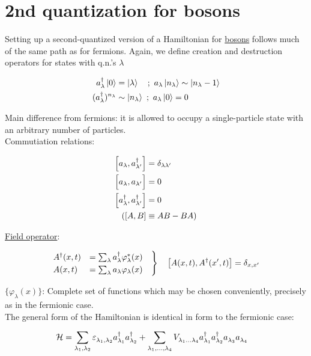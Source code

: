 \chapter{2nd quantization for bosons}

Setting up a second-quantized version of a Hamiltonian for \underline{bosons} follows much of the same path as for fermions. Again, we define creation and destruction operators for states with q.n.'s $\lambda$

\begin{align}
    a_\lambda^\dagger \ket{0} &= \ket{\lambda} \quad ; \ a_\lambda\ket{n_\lambda} \sim \ket{n_\lambda - 1} \\
    (a_\lambda^\dagger)^{n_\lambda} &\sim \ket{n_\lambda} \ ; \ a_\lambda\ket{0} = 0
\end{align}

Main difference from fermions: it is allowed to occupy a single-particle state with an arbitrary number of particles. \\  Commutiation relations:

\begin{align}
    \comm{a_\lambda}{a_{\lambda'}^\dagger} &= \delta_{\lambda \lambda'} \\
    \comm\Big{a_\lambda}{a_{\lambda'}} &= 0 \\
    \comm{a_\lambda^\dagger}{a_{\lambda'}^\dagger} &= 0 \\ 
    (\comm{A}{B} &\equiv AB - BA)
\end{align}

 \uline{Field operator}:

\begin{align}
    \begin{rcases}
    A^\dagger (x, t) &= \sum_\lambda a_\lambda^\dagger \varphi_\lambda^*(x) \quad \\
    A(x, t) &= \sum_\lambda a_\lambda \varphi_\lambda(x)
    \end{rcases}
    \quad
    \comm{A(x,t)}{A^\dagger (x', t)} = \delta_{x, x'}
\end{align}

 $\{\varphi_\lambda(x)\}$: Complete set of functions which may be chosen conveniently, precisely as in the fermionic case. \\

 The general form of the Hamiltonian is identical in form to the fermionic case:

\begin{tcolorbox}
    \begin{align}
        \mathcal{H} &= \sum_{\lambda_1, \lambda_2} \varepsilon_{\lambda_1, \lambda_2}^{} a_{\lambda_1}^\dagger a_{\lambda_2}^\dagger
        + \sum_{\lambda_1, ..., \lambda_4}V_{\lambda_1 ... \lambda_4}^{}a_{\lambda_1}^\dagger a_{\lambda_2}^\dagger a_{\lambda_3}^{} a_{\lambda_4}^{}
    \end{align}
\end{tcolorbox}

